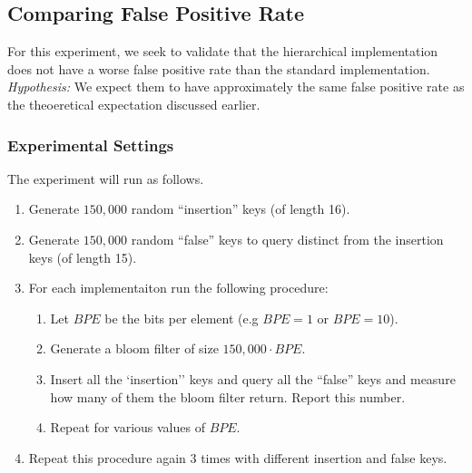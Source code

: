 
\subsection{Comparing False Positive Rate}

For this experiment, we seek to validate that the hierarchical implementation does not have a worse false positive rate than the standard implementation.
\textit{Hypothesis:} We expect them to have approximately the same false positive rate as the theoeretical expectation discussed earlier.

\subsubsection{Experimental Settings}

The experiment will run as follows. 
\begin{enumerate}
\item Generate $150,000$ random ``insertion'' keys (of length 16).
\item Generate $150,000$ random ``false'' keys to query distinct from the insertion keys (of length 15).
\item For each implementaiton run the following procedure:
\begin{enumerate}
    \item Let $BPE$ be the bits per element (e.g $BPE = 1$ or $BPE = 10$).
    \item Generate a bloom filter of size $150,000\cdot BPE$.
    \item Insert all the `insertion'' keys and query all the ``false'' keys and measure how many of them the bloom filter return. Report this number.
    \item Repeat for various values of $BPE$.
\end{enumerate}
\item Repeat this procedure again $3$ times with different insertion and false keys.
\end{enumerate}


